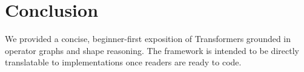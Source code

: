 \documentclass[10pt]{article}
\begin{document}
\section{Conclusion}
We provided a concise, beginner-first exposition of Transformers grounded in operator graphs and shape reasoning. The framework is intended to be directly translatable to implementations once readers are ready to code.

% 

\end{document}
